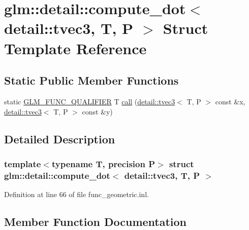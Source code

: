 \hypertarget{structglm_1_1detail_1_1compute__dot_3_01detail_1_1tvec3_00_01_t_00_01_p_01_4}{}\section{glm\+:\+:detail\+:\+:compute\+\_\+dot$<$ detail\+:\+:tvec3, T, P $>$ Struct Template Reference}
\label{structglm_1_1detail_1_1compute__dot_3_01detail_1_1tvec3_00_01_t_00_01_p_01_4}
\subsection*{Static Public Member Functions}
\begin{DoxyCompactItemize}
\item 
static \hyperlink{setup_8hpp_a33fdea6f91c5f834105f7415e2a64407}{G\+L\+M\+\_\+\+F\+U\+N\+C\+\_\+\+Q\+U\+A\+L\+I\+F\+I\+ER} T \hyperlink{structglm_1_1detail_1_1compute__dot_3_01detail_1_1tvec3_00_01_t_00_01_p_01_4_a2320996e972e6955b19c23ab96c77626}{call} (\hyperlink{structglm_1_1detail_1_1tvec3}{detail\+::tvec3}$<$ T, P $>$ const \&x, \hyperlink{structglm_1_1detail_1_1tvec3}{detail\+::tvec3}$<$ T, P $>$ const \&y)
\end{DoxyCompactItemize}


\subsection{Detailed Description}
\subsubsection*{template$<$typename T, precision P$>$\newline
struct glm\+::detail\+::compute\+\_\+dot$<$ detail\+::tvec3, T, P $>$}



Definition at line 66 of file func\+\_\+geometric.\+inl.



\subsection{Member Function Documentation}
\mbox{\label{structglm_1_1detail_1_1compute__dot_3_01detail_1_1tvec3_00_01_t_00_01_p_01_4_a2320996e972e6955b19c23ab96c77626}} 
